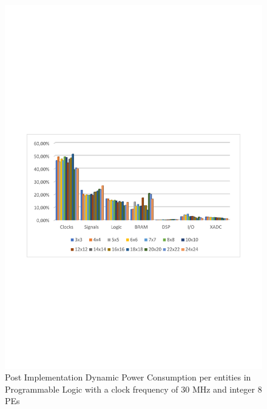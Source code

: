 \begin{itemize}
\begin{figure}[!htbp]
\includegraphics[scale=0.7,angle=0]{./figure/graphs/power_pldyn_div_int8_freq_30mhz.pdf}
\caption{Post Implementation Dynamic Power Consumption per entities in Programmable Logic with a clock frequency of 30 MHz and integer 8 PEs}
\label{fig:dynpowint8ent30}
\end{figure}
\begin{figure}[!htbp]
\centering
\captionsetup{justification=centering}

\end{figure}
\end{itemize}
